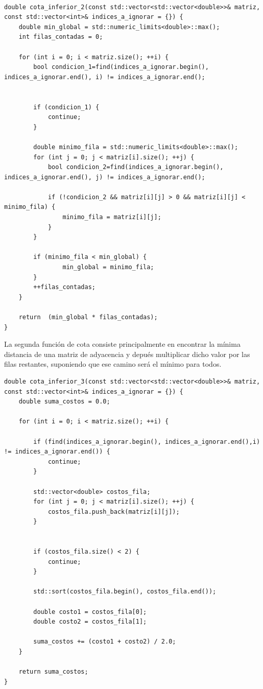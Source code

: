 \documentclass[11pt,openany]{book}
\begin{document}
\begin{lstlisting}    

double cota_inferior_2(const std::vector<std::vector<double>>& matriz, const std::vector<int>& indices_a_ignorar = {}) {
    double min_global = std::numeric_limits<double>::max();
    int filas_contadas = 0;

    for (int i = 0; i < matriz.size(); ++i) {
        bool condicion_1=find(indices_a_ignorar.begin(), indices_a_ignorar.end(), i) != indices_a_ignorar.end();

        
        if (condicion_1) {
            continue;
        }

        double minimo_fila = std::numeric_limits<double>::max();
        for (int j = 0; j < matriz[i].size(); ++j) {
            bool condicion_2=find(indices_a_ignorar.begin(), indices_a_ignorar.end(), j) != indices_a_ignorar.end();
            
            if (!condicion_2 && matriz[i][j] > 0 && matriz[i][j] < minimo_fila) {
                minimo_fila = matriz[i][j];
            }
        }

        if (minimo_fila < min_global) {
                min_global = minimo_fila;
        }
        ++filas_contadas;
    }

    return  (min_global * filas_contadas);
}
\end{lstlisting}

La segunda función de cota consiste principalmente en encontrar la mínima distancia de una matriz de adyacencia y depués multiplicar dicho valor por
las filas restantes, suponiendo que ese camino será el mínimo para todos.
\begin{lstlisting}          
double cota_inferior_3(const std::vector<std::vector<double>>& matriz, const std::vector<int>& indices_a_ignorar = {}) {
    double suma_costos = 0.0;

    for (int i = 0; i < matriz.size(); ++i) {
        
        if (find(indices_a_ignorar.begin(), indices_a_ignorar.end(),i) != indices_a_ignorar.end()) {
            continue;
        }

        std::vector<double> costos_fila;
        for (int j = 0; j < matriz[i].size(); ++j) {
            costos_fila.push_back(matriz[i][j]);
        }

        
        if (costos_fila.size() < 2) {
            continue;  
        }

        std::sort(costos_fila.begin(), costos_fila.end());

        double costo1 = costos_fila[0];
        double costo2 = costos_fila[1];

        suma_costos += (costo1 + costo2) / 2.0;
    }

    return suma_costos;
}

\end{lstlisting}
\end{document}
